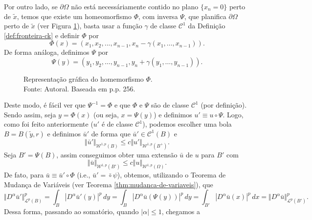\documentclass[a4paper, 11pt]{book}
\theoremstyle{definition}
\newcommand{\cC}{\mathcal{C}}
\newcommand{\cL}{\mathcal{L}}
\newcommand{\cW}{\mathcal{W}}
\begin{document}
\begin{prf}
    Por outro lado, se $\partial\Omega$ não está necessáriamente contido no plano $\{x_n = 0\}$ perto de $\tilde x$, temos que existe um homeomorfismo $\Phi$, com inversa $\Psi$, que planifica $\partial \Omega$ perto de $\tilde x$ (ver Figura \ref{fig:homeomorfismo}),  basta usar a função $\gamma$ de classe $\cC^1$ da Definição \ref{def:fronteira-ck} e definir $\Phi$ por
    \begin{equation} \label{eq:Phi}
        \Phi(x) = (x_1,x_2,...,x_{n-1}, x_n - \gamma(x_1,\dots,x_{n-1})).
    \end{equation}
    De forma análoga, definimos $\Psi$ por
    \begin{equation} \label{eq:Psi}
        \Psi(y) = (y_1,y_2,\dots,y_{n-1},y_n + \gamma(y_1,\dots,y_{n-1})).
    \end{equation}
    \begin{figure}
        \centering
        
        \caption{Representação gráfica do homemorfismo $\Phi$.\\Fonte: Autoral. Baseada em \cite{evans-pde} p.p. 256.}
        \label{fig:homeomorfismo}
    \end{figure}
    \!\!Deste modo, é fácil ver que $\Psi^{-1} = \Phi$ e que $\Phi$ e $\Psi$ são de classe $\cC^1$ (por definição). Sendo assim, seja $y = \Phi(x)$ (ou seja, $x = \Psi(y)$) e definimos $u' \equiv u \circ \Psi$. Logo, como foi feito anteriormente ($u'$ é de classe $\cC^1$), podemos escolher uma bola $B = B(\tilde y, r)$ e definimos $\bar u'$ de forma que $\bar u' \in \cC^1(B)$ e
    \begin{equation} \label{eq:BBBB}
        \Vert \bar u' \Vert_{\cW^{1,p}(B)} \leqslant c \Vert u' \Vert_{\cW^{1,p}(B^+)}.
    \end{equation}
    Seja $B' = \Psi(B)$, assim conseguimos obter uma extensão $\bar u$ de $u$ para $B'$ com
    \[
        \Vert \bar u \Vert_{\cW^{1,p}(B')} \leqslant c \Vert u \Vert_{\cW^{1,p}(\Omega)}.
    \]
    De fato, para $\bar u \equiv \bar u' \circ \Phi$ (i.e., $\bar u' = \bar \circ \psi$), obtemos, utilizando o Teorema de Mudança de Variáveis (ver Teorema \ref{thm:mudanca-de-variaveis}), que
    \[
        \Vert D^\alpha \bar u' \Vert_{\cL^p(B)}^p = \int_B |D^\alpha \bar u'(y)|^p \,dy = \int_B |D^\alpha \bar u (\Psi (y))|^p \,dy = \int_{B'} |D^\alpha \bar u (x)|^p \,dx = \Vert D^\alpha \bar u \Vert_{\cL^p(B')}^p.
    \]
    Dessa forma, passando ao somatório, quando $|\alpha| \leqslant 1$, chegamos a
    \begin{equation} \label{eq:normaBigualnormaW}

\end{equation}
\end{prf}
\end{document}
